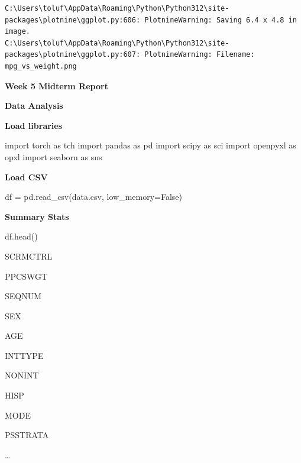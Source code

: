 \documentclass[
  letterpaper,
  DIV=11,
  numbers=noendperiod]{scrreprt}
\newenvironment{Shaded}{\begin{snugshade}}{\end{snugshade}}
\newcommand{\ImportTok}[1]{\textcolor[rgb]{0.00,0.46,0.62}{#1}}
\newcommand{\NormalTok}[1]{\textcolor[rgb]{0.00,0.23,0.31}{#1}}
\newcommand{\OperatorTok}[1]{\textcolor[rgb]{0.37,0.37,0.37}{#1}}
\newcommand{\StringTok}[1]{\textcolor[rgb]{0.13,0.47,0.30}{#1}}
\newcommand{\VariableTok}[1]{\textcolor[rgb]{0.07,0.07,0.07}{#1}}
\begin{document}
\begin{verbatim}
C:\Users\toluf\AppData\Roaming\Python\Python312\site-packages\plotnine\ggplot.py:606: PlotnineWarning: Saving 6.4 x 4.8 in image.
C:\Users\toluf\AppData\Roaming\Python\Python312\site-packages\plotnine\ggplot.py:607: PlotnineWarning: Filename: mpg_vs_weight.png
\end{verbatim}

\textbf{Week 5 Midterm Report}

\textbf{Data Analysis}

\textbf{Load libraries}

\begin{Shaded}
\begin{Highlighting}[]
\ImportTok{import}\NormalTok{ torch }\ImportTok{as}\NormalTok{ tch}
\ImportTok{import}\NormalTok{ pandas }\ImportTok{as}\NormalTok{ pd}
\ImportTok{import}\NormalTok{ scipy }\ImportTok{as}\NormalTok{ sci}
\ImportTok{import}\NormalTok{ openpyxl }\ImportTok{as}\NormalTok{ opxl}
\ImportTok{import}\NormalTok{ seaborn }\ImportTok{as}\NormalTok{ sns}
\end{Highlighting}
\end{Shaded}

\textbf{Load CSV}

\begin{Shaded}
\begin{Highlighting}[]
\NormalTok{df }\OperatorTok{=}\NormalTok{ pd.read\_csv(}\StringTok{\textquotesingle{}data.csv\textquotesingle{}}\NormalTok{, low\_memory}\OperatorTok{=}\VariableTok{False}\NormalTok{)}
\end{Highlighting}
\end{Shaded}

\textbf{Summary Stats}

\begin{Shaded}
\begin{Highlighting}[]
\NormalTok{df.head()}
\end{Highlighting}
\end{Shaded}

SCRMCTRL

PPCSWGT

SEQNUM

SEX

AGE

INTTYPE

NONINT

HISP

MODE

PSSTRATA

\ldots{}
\end{document}

